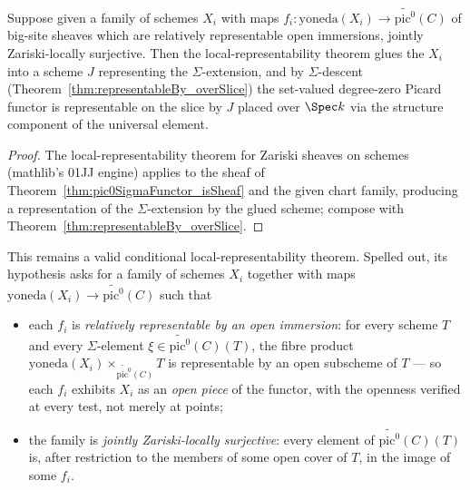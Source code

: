 \begin{definition}
  \label{def:pic0RepresentableByOfCharts}
  \leanok
  Suppose given a family of schemes \(X_i\) with maps
  \(f_i \colon \mathrm{yoneda}(X_i) \to \widetilde{\mathrm{pic}^0}(C)\) of big-site sheaves
  which are relatively representable open immersions, jointly Zariski-locally surjective.
  Then the local-representability theorem glues the \(X_i\) into a scheme \(J\)
  representing the \(\Sigma\)-extension, and by \(\Sigma\)-descent
  (Theorem~\ref{thm:representableBy_overSlice}) the set-valued degree-zero Picard functor is
  representable on the slice by \(J\) placed over \(\Spec k\) via the structure component of
  the universal element.
\end{definition}
\begin{proof}
  \leanok
  The local-representability theorem for Zariski sheaves on schemes (mathlib's
  01JJ engine) applies to the sheaf of Theorem~\ref{thm:pic0SigmaFunctor_isSheaf} and the
  given chart family, producing a representation of the \(\Sigma\)-extension by the glued
  scheme; compose with Theorem~\ref{thm:representableBy_overSlice}.
\end{proof}

This remains a valid conditional local-representability theorem. Spelled out, its hypothesis
asks for a family of schemes \(X_i\) together
with maps \(\mathrm{yoneda}(X_i) \to \widetilde{\mathrm{pic}^0}(C)\) such that

\begin{itemize}
  \item each \(f_i\) is \emph{relatively representable by an open immersion}: for every
    scheme \(T\) and every \(\Sigma\)-element \(\xi \in \widetilde{\mathrm{pic}^0}(C)(T)\),
    the fibre product \(\mathrm{yoneda}(X_i) \times_{\widetilde{\mathrm{pic}^0}(C)} T\) is
    representable by an open subscheme of \(T\) --- so each \(f_i\) exhibits \(X_i\) as an
    \emph{open piece} of the functor, with the openness verified at every test, not merely
    at points;
  \item the family is \emph{jointly Zariski-locally surjective}: every element of
    \(\widetilde{\mathrm{pic}^0}(C)(T)\) is, after restriction to the members of some open
    cover of \(T\), in the image of some \(f_i\).
\end{itemize}

